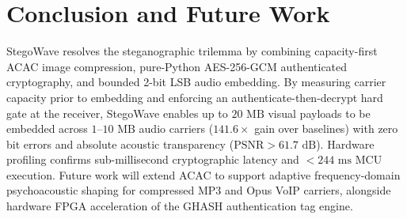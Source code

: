 \documentclass[10pt,conference]{IEEEtran}
\begin{document}
\section{Conclusion and Future Work}
StegoWave resolves the steganographic trilemma by combining capacity-first ACAC image compression, pure-Python AES-256-GCM authenticated cryptography, and bounded 2-bit LSB audio embedding. By measuring carrier capacity prior to embedding and enforcing an authenticate-then-decrypt hard gate at the receiver, StegoWave enables up to $20\text{ MB}$ visual payloads to be embedded across $1\text{--}10\text{ MB}$ audio carriers ($141.6\times$ gain over baselines) with zero bit errors and absolute acoustic transparency ($\text{PSNR} > 61.7\text{ dB}$). Hardware profiling confirms sub-millisecond cryptographic latency and $<244\text{ ms}$ MCU execution. Future work will extend ACAC to support adaptive frequency-domain psychoacoustic shaping for compressed MP3 and Opus VoIP carriers, alongside hardware FPGA acceleration of the GHASH authentication tag engine.
\end{document}
